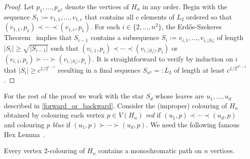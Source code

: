 \documentclass[kpfonts]{patmorin}
\renewcommand{\ge}{\geqslant}
\begin{document}
\begin{proof}
    Let $p_1,\ldots,p_{n^2}$ denote the vertices of $H_n$ in any order.
    Begin with the sequence $S_1:=v_{1,1},\ldots,v_{1,c}$ that contains all $c$ elements of $L_2$ ordered so that $(v_{1,1},p_1)\prec\cdots\prec(v_{1,c},p_1)$.  For each $i\in\{2,\ldots,n^2\}$, the Erd\H{o}s-Szekeres Theorem~\citep{ES35} implies that $S_{i-1}$ contains a subsequence $S_i:=v_{i,1},\ldots,v_{i,|S_i|}$ of length $|S_i|\ge \sqrt{|S_{i-1}|}$ such that $(v_{i,1},p_i)\prec\cdots\prec(v_{i,|S_i|},p_i)$ or $(v_{i,1},p_i)\succ\cdots\succ(v_{i,|S_i|},p_i)$.  It is straightforward to verify by induction on $i$ that $|S_i| \ge c^{1/2^{i-1}}$ resulting in a final sequence $S_{n^2}=:L_3$ of length at least $c^{1/2^{n^2-1}}$.
\end{proof}


For the rest of the proof we work with the star $S_d$ whose leaves are $u_1,\ldots,u_d$ described in \cref{forward_or_backward}.  Consider the (improper) colouring of $H_n$ obtained by colouring each vertex $p\in V(H_n)$ \emph{red} if $(u_1,p)\prec\cdots\prec (u_d,p)$ and colouring $p$ \emph{blue} if $(u_1,p)\succ\cdots\succ(u_d,p)$. We need the following famous Hex Lemma~\citep{Gale79}.

\begin{lem} \label{hex_lemma}
Every vertex 2-colouring of $H_n$ contains a monochromatic path on $n$ vertices.
\end{lem}

\end{document}

